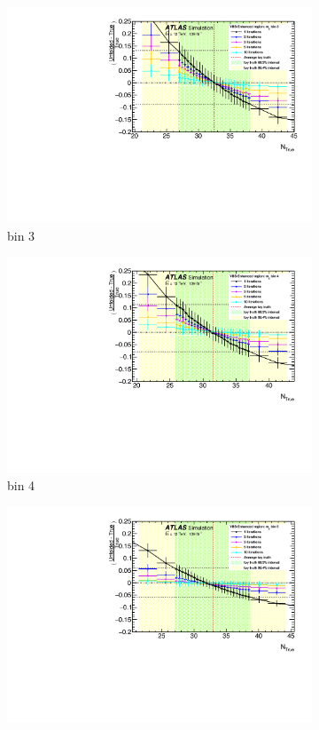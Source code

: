 \begin{itemize}
{\begin{figure}[htb]
\begin{subfigure}{.48\textwidth}
            \includegraphics[width=.9\linewidth]{figures/Analysis/Unfolding/unfolding_bias_mjj_VBSEnh_bin3.pdf}
            \caption{ bin 3 }
        \end{subfigure}
        \begin{subfigure}{.48\textwidth}
            \centering
            \includegraphics[width=.9\linewidth]{figures/Analysis/Unfolding/unfolding_bias_mjj_VBSEnh_bin4.pdf}
            \caption{bin 4 }
        \end{subfigure}
        \begin{subfigure}{.48\textwidth}
            \centering
            \includegraphics[width=.9\linewidth]{figures/Analysis/Unfolding/unfolding_bias_mjj_VBSEnh_bin5.pdf}

\end{subfigure}
\end{figure}}
\end{itemize}
